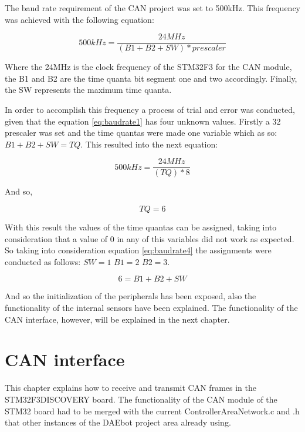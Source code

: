 \documentclass[12pt]{report}%
\begin{document}
The baud rate requirement of the CAN project was set to 500kHz. This frequency was achieved with the following equation:

\begin{equation} \label{eq:baudrate1}
	500kHz= \frac{24MHz}{(B1+B2+SW)*prescaler}
\end{equation}

Where the 24MHz is the clock frequency of the STM32F3 for the CAN module, the B1 and B2 are the time quanta bit segment one and two accordingly. Finally, the SW represents the maximum time quanta.

In order to accomplish this frequency a process of trial and error was conducted, given that the equation \ref{eq:baudrate1} has four unknown values. Firstly a 32 prescaler was set and the time quantas were made one variable which as so: $B1 + B2 + SW = TQ$. This resulted into the next equation:

\begin{equation} \label{eq:baudrate2}
	500kHz= \frac{24MHz}{(TQ)*8}
\end{equation}

And so,

\begin{equation} \label{eq:baudrate3}
	TQ = 6
\end{equation}

With this result the values of the time quantas can be assigned, taking into consideration that a value of 0 in any of this variables did not work as expected. So taking into consideration equation \ref{eq:baudrate4} the assignments were conducted as follows: $SW=1$ $B1=2$ $B2=3$.

\begin{equation} \label{eq:baudrate4}
	6 = B1+B2+SW
\end{equation}

And so the initialization of the peripherals has been exposed, also the functionality of the internal sensors have been explained. The functionality of the CAN interface, however, will be explained in the next chapter.

\chapter{CAN interface}
This chapter explains how to receive and transmit CAN frames in the STM32F3DISCOVERY board. The functionality of the CAN module of the STM32 board had to be merged with the current ControllerAreaNetwork.c and .h that other instances of the DAEbot project area already using.
\end{document}
